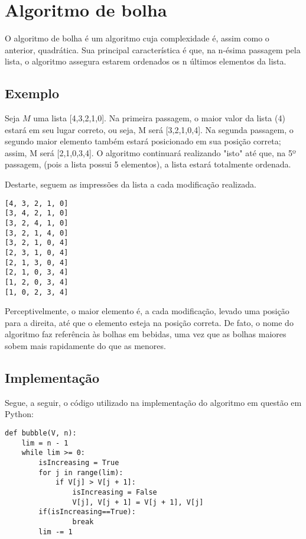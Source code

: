 \section{Algoritmo de bolha}
O algoritmo de bolha é um algoritmo cuja complexidade é, assim como o anterior, quadrática. Sua principal característica é que, na n-ésima passagem pela lista, o algoritmo assegura estarem ordenados os n últimos elementos da lista.

\subsection{Exemplo}
Seja $M$ uma lista [4,3,2,1,0].
Na primeira passagem, o maior valor da lista (4) estará em seu lugar correto, ou seja, M será [3,2,1,0,4]. Na segunda passagem, o segundo maior elemento também estará posicionado em sua posição correta; assim, M será [2,1,0,3,4].
O algoritmo continuará realizando "isto" até que, na 5º passagem, (pois a lista possui 5 elementos), a lista estará totalmente ordenada.

Destarte, seguem as impressões da lista a cada modificação realizada. 

\begin{lstlisting}
[4, 3, 2, 1, 0]
[3, 4, 2, 1, 0]
[3, 2, 4, 1, 0]
[3, 2, 1, 4, 0]
[3, 2, 1, 0, 4]
[2, 3, 1, 0, 4]
[2, 1, 3, 0, 4]
[2, 1, 0, 3, 4]
[1, 2, 0, 3, 4]
[1, 0, 2, 3, 4]
\end{lstlisting}

Perceptivelmente, o maior elemento é, a cada modificação, levado uma posição para a direita, até que o elemento esteja na posição correta. De fato, o nome do algoritmo faz referência às bolhas em bebidas, uma vez que as bolhas maiores sobem mais rapidamente do que as menores.

\newpage
\subsection{Implementação}
Segue, a seguir, o código utilizado na implementação do algoritmo em questão em Python:

\begin{lstlisting}
def bubble(V, n):
    lim = n - 1
    while lim >= 0:
        isIncreasing = True
        for j in range(lim):
            if V[j] > V[j + 1]:
                isIncreasing = False
                V[j], V[j + 1] = V[j + 1], V[j]
        if(isIncreasing==True): 
                break
        lim -= 1
\end{lstlisting}


